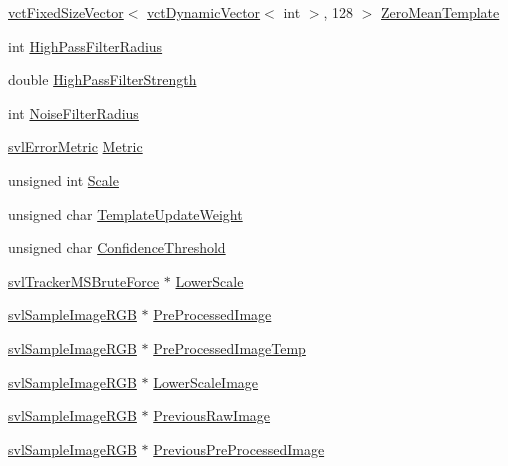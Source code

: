 \begin{DoxyCompactItemize}
\item 
\hyperlink{classvct_fixed_size_vector}{vct\+Fixed\+Size\+Vector}$<$ \hyperlink{classvct_dynamic_vector}{vct\+Dynamic\+Vector}$<$ int $>$, 128 $>$ \hyperlink{classsvl_tracker_m_s_brute_force_abc0f2604ffefdaeb0cca4d5653edf099}{Zero\+Mean\+Template}
\item 
int \hyperlink{classsvl_tracker_m_s_brute_force_a5d2f61d237e1ba77ef98d12c2c7f8af0}{High\+Pass\+Filter\+Radius}
\item 
double \hyperlink{classsvl_tracker_m_s_brute_force_a1b8a2ad541bd774a0618c78b6c57c4c6}{High\+Pass\+Filter\+Strength}
\item 
int \hyperlink{classsvl_tracker_m_s_brute_force_a8b1f609a7cffb5680c15ad1eb6dd6de4}{Noise\+Filter\+Radius}
\item 
\hyperlink{svl_definitions_8h_ade0b97ec3319ac710d7478dd2b608727}{svl\+Error\+Metric} \hyperlink{classsvl_tracker_m_s_brute_force_a4a57d6c469da0e33705764236ea91f01}{Metric}
\item 
unsigned int \hyperlink{classsvl_tracker_m_s_brute_force_a11a762940bf3cd20ee15c6719fc01c3d}{Scale}
\item 
unsigned char \hyperlink{classsvl_tracker_m_s_brute_force_ab88fcbddc49c7020a7e86693ddd68c51}{Template\+Update\+Weight}
\item 
unsigned char \hyperlink{classsvl_tracker_m_s_brute_force_ad6790c4ae886e44532664882276d2bfd}{Confidence\+Threshold}
\item 
\hyperlink{classsvl_tracker_m_s_brute_force}{svl\+Tracker\+M\+S\+Brute\+Force} $\ast$ \hyperlink{classsvl_tracker_m_s_brute_force_a2dc875593484e49b66d784181e1ec3aa}{Lower\+Scale}
\item 
\hyperlink{svl_sample_image_types_8h_a54a55112dd3879f71f990d2945375f1a}{svl\+Sample\+Image\+R\+G\+B} $\ast$ \hyperlink{classsvl_tracker_m_s_brute_force_ad180d6f5e193c25793a558bc6ca110fa}{Pre\+Processed\+Image}
\item 
\hyperlink{svl_sample_image_types_8h_a54a55112dd3879f71f990d2945375f1a}{svl\+Sample\+Image\+R\+G\+B} $\ast$ \hyperlink{classsvl_tracker_m_s_brute_force_acb1c53a35d943e3f614519a14eb38c60}{Pre\+Processed\+Image\+Temp}
\item 
\hyperlink{svl_sample_image_types_8h_a54a55112dd3879f71f990d2945375f1a}{svl\+Sample\+Image\+R\+G\+B} $\ast$ \hyperlink{classsvl_tracker_m_s_brute_force_a762b3810ed7aa7f48500567e5dbb2de6}{Lower\+Scale\+Image}
\item 
\hyperlink{svl_sample_image_types_8h_a54a55112dd3879f71f990d2945375f1a}{svl\+Sample\+Image\+R\+G\+B} $\ast$ \hyperlink{classsvl_tracker_m_s_brute_force_acd953504f3298ec761d2dbf027c8b251}{Previous\+Raw\+Image}
\item 
\hyperlink{svl_sample_image_types_8h_a54a55112dd3879f71f990d2945375f1a}{svl\+Sample\+Image\+R\+G\+B} $\ast$ \hyperlink{classsvl_tracker_m_s_brute_force_a12bc5e5e5c92916372982f0d9b72a7c1}{Previous\+Pre\+Processed\+Image}
\end{DoxyCompactItemize}


